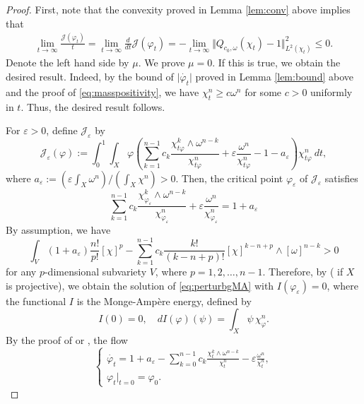 \documentclass[10pt,a4paper]{amsart}
\numberwithin{equation}{section}
\begin{document}
\begin{proof}
    First, note that the convexity proved in Lemma \ref{lem:conv} above implies that
    \begin{align*}
        \lim_{t\to\infty}\frac{\mathcal{J}(\varphi_t)}{t}=\lim_{t\to\infty}\frac{d}{dt}\mathcal{J}(\varphi_t)=-\lim_{t\to\infty}\Vert Q_{c_0,\omega}(\chi_t)-1\Vert^2_{L^2(\chi_t)}\le0.
    \end{align*}
    Denote the left hand side by $\mu$. We prove $\mu=0$. If this is true, we obtain the desired result. Indeed, by the bound of $\vert\dot{\varphi_t}\vert$ proved in Lemma \ref{lem:bound} above and the proof of \eqref{eq:masspositivity}, we have $\chi^n_t\ge c\omega^n$ for some $c>0$ uniformly in $t$. Thus, the desired result follows.
    
    For $\varepsilon>0$, define $\mathcal{J}_\varepsilon$ by
    $$\mathcal{J}_{\varepsilon}(\varphi):=\int_0^1\int_X\varphi\left(\sum_{k=1}^{n-1}c_k\frac{\chi_{t\varphi}^k\wedge\omega^{n-k}}{\chi_{t\varphi}^n}+\varepsilon\frac{\omega^n}{\chi_{t\varphi}^n}-1-a_{\varepsilon}\right)\chi_{t\varphi}^n\ dt,$$
    where $a_\varepsilon:=(\varepsilon\int_X\omega^n)/(\int_X\chi^n)>0$.
    Then, the critical point $\varphi_\varepsilon$ of $\mathcal{J}_{\varepsilon}$ satisfies
    \begin{equation}\label{eq:perturbgMA}
        \sum_{k=1}^{n-1}c_k\frac{\chi_{\varphi_\varepsilon}^k\wedge\omega^{n-k}}{\chi_{\varphi_\varepsilon}^n}+\varepsilon\frac{\omega^n}{\chi_{\varphi_\varepsilon}^n}=1+a_{\varepsilon}
    \end{equation}
    By assumption, we have
    $$\int_V(1+a_\varepsilon)\frac{n!}{p!}[\chi]^p-\sum_{k=1}^{n-1}c_k\frac{k!}{(k-n+p)!}[\chi]^{k-n+p}\wedge[\omega]^{n-k}>0$$
    for any $p$-dimensional subvariety $V$, where $p=1,2,\dots,{n-1}$.
    Therefore, by \cite{FM} (\cite{Datar-Pingali} if $X$ is projective), we obtain the solution of \eqref{eq:perturbgMA} with $I(\varphi_\varepsilon)=0$, where the functional $I$ is the Monge-Ampère energy, defined by
    $$I(0)=0, \quad dI(\varphi)(\psi)=\int_X\psi\,\chi_\varphi^n.$$
    By the proof of \cite[Theorem 3]{PT} or \cite[Theorem 7.5]{Sun15}, the flow
    \begin{equation}\label{eq:perturbmixedHessianflow}
    \begin{cases}
        \dot{\varphi_t}=1+a_\varepsilon-\sum_{k=0}^{n-1}c_k\frac{\chi_t^k\wedge\omega^{n-k}}{\chi_t^n}-\varepsilon\frac{\omega^n}{\chi^n_t},\\
        \varphi_t|_{t=0}=\varphi_0.
    \end{cases}

\end{equation}
\end{proof}
\end{document}
